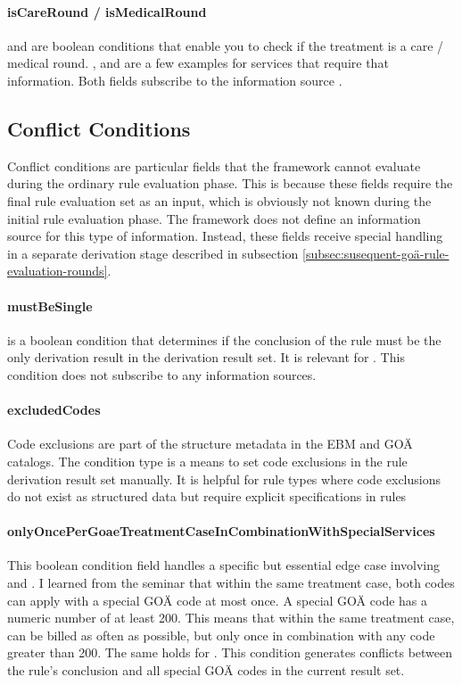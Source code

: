 \paragraph{isCareRound / isMedicalRound}
 and  are boolean conditions that enable you to check if the treatment is a care / medical round.
,  and  are a few examples for services that require that information.
Both fields subscribe to the information source .




\subsection{Conflict Conditions}\label{subsec:conflict-conditions}
Conflict conditions are particular fields that the framework cannot evaluate during the ordinary rule evaluation phase.
This is because these fields require the final rule evaluation set as an input, which is obviously not known during the initial rule evaluation phase.
The framework does not define an information source for this type of information.
Instead, these fields receive special handling in a separate derivation stage described in subsection \ref{subsec:susequent-goä-rule-evaluation-rounds}.
\paragraph{mustBeSingle}
 is a boolean condition that determines if the conclusion of the rule must be the only derivation result in the derivation result set.
It is relevant for .
This condition does not subscribe to any information sources.

\paragraph{excludedCodes}
Code exclusions are part of the structure metadata in the EBM and GOÄ catalogs.
The \excludedCodes condition type is a means to set code exclusions in the rule derivation result set manually.
It is helpful for rule types where code exclusions do not exist as structured data but require explicit specifications in rules

\paragraph{onlyOncePerGoaeTreatmentCaseInCombinationWithSpecialServices}
This boolean condition field handles a specific but essential edge case involving  and .
I learned from the \PVC seminar that within the same treatment case, both codes can apply with a special GOÄ code at most once.
A special GOÄ code has a numeric number of at least 200.
This means that within the same treatment case,  can be billed as often as possible, but only once in combination with any code greater than 200.
The same holds for .
This condition generates conflicts between the rule's conclusion and all special GOÄ codes in the current result set.
